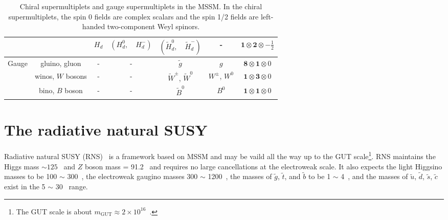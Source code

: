 \begin{table}[htp]
{\begin{tabular}{ccccccc}
                                    &                                                            & $H_{d}$        & $(H^{0}_{d}, \quad H^{-}_{d})$                   & $(\widetilde{H}^{0}_{d}, \quad \widetilde{H}^{-}_{d})$ & -                  & $\mathbf{1} \otimes \mathbf{2} \otimes -\frac{1}{2}$\\
            \hline
            \hline
            \multirow{3}{*}{Gauge}  & gluino, gluon                                              & -              & -                                                & $\widetilde{g}$                                        & $g$                & $\mathbf{8} \otimes \mathbf{1} \otimes 0$\\
                                    & winos, $W$ bosons                                          & -              & -                                                & $\widetilde{W}^{\pm}$, $\widetilde{W}^{0}$             & $W^{\pm}$, $W^{0}$ & $\mathbf{1} \otimes \mathbf{3} \otimes 0$\\
                                    & bino, $B$ boson                                            & -              & -                                                & $\widetilde{B}^{0}$                                    & $B^{0}$            & $\mathbf{1} \otimes \mathbf{1} \otimes 0$\\
            \hline
            \hline
        \end{tabular}
    }
    \caption{Chiral supermultiplets and gauge supermultiplets in the MSSM.
    In the chiral supermultiplets, the spin 0 fields are complex scalars and the spin 1/2 fields are left-handed two-component Weyl spinors.}
    \label{tab:susy_particle_contents}
\end{table}%


\section{The radiative natural SUSY}
\label{sec:susy_rns}
Radiative natural SUSY (RNS)~\cite{Baer:2013xua, Baer:2012up, Baer:2012se, Baer:2012cf} is a framework based on MSSM and may be vaild all the way up to the GUT scale\footnote{The GUT scale is about $m_{\text{GUT}} \approx 2 \times 10^{16}$~{\GeV}.}.
RNS maintains the Higgs mass \mH $\sim 125$~{\GeV} and $Z$ boson mass \mZ = 91.2~{\GeV} and requires no large cancellations at the electroweak scale.
It also expects the light Higgsino masses to be 100 $\sim$ 300~{\GeV}, the electroweak gaugino masses 300 $\sim$ 1200~{\GeV}, the masses of $\tilde{g}$, $\tilde{t}$, and $\tilde{b}$ to be 1 $\sim$ 4~{\TeV}, and the masses of $\tilde{u}$, $\tilde{d}$, $\tilde{s}$, $\tilde{c}$ exist in the 5 $\sim$ 30~{\TeV} range.

